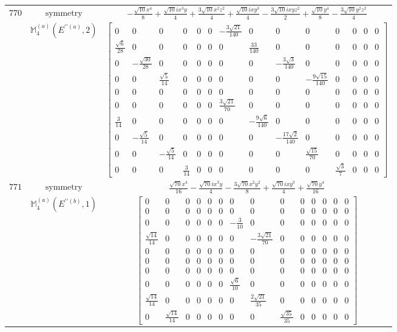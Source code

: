 \documentclass[fleqn,8pt,landscape]{jsarticle}
\begin{document}
\begin{longtable}{ccc}
$ 770 $ & $ \text{symmetry} $ & $ - \frac{\sqrt{10} x^{4}}{8} + \frac{\sqrt{10} i x^{3} y}{4} + \frac{3 \sqrt{10} x^{2} z^{2}}{4} + \frac{\sqrt{10} i x y^{3}}{4} - \frac{3 \sqrt{10} i x y z^{2}}{2} + \frac{\sqrt{10} y^{4}}{8} - \frac{3 \sqrt{10} y^{2} z^{2}}{4} $ \\
$  $ & $ \mathbb{M}_{4}^{(a)}(E^{\prime\prime(a)},2) $ & $ \begin{bmatrix} 0 & 0 & 0 & 0 & 0 & 0 & - \frac{3 \sqrt{21}}{140} & 0 & 0 & 0 & 0 & 0 & 0 & 0 \\ \frac{\sqrt{6}}{28} & 0 & 0 & 0 & 0 & 0 & 0 & \frac{33}{140} & 0 & 0 & 0 & 0 & 0 & 0 \\ 0 & - \frac{\sqrt{30}}{28} & 0 & 0 & 0 & 0 & 0 & 0 & - \frac{3 \sqrt{3}}{140} & 0 & 0 & 0 & 0 & 0 \\ 0 & 0 & \frac{\sqrt{5}}{14} & 0 & 0 & 0 & 0 & 0 & 0 & - \frac{9 \sqrt{15}}{140} & 0 & 0 & 0 & 0 \\ 0 & 0 & 0 & 0 & 0 & 0 & 0 & 0 & 0 & 0 & 0 & 0 & 0 & 0 \\ 0 & 0 & 0 & 0 & 0 & 0 & \frac{3 \sqrt{21}}{70} & 0 & 0 & 0 & 0 & 0 & 0 & 0 \\ \frac{3}{14} & 0 & 0 & 0 & 0 & 0 & 0 & - \frac{9 \sqrt{6}}{140} & 0 & 0 & 0 & 0 & 0 & 0 \\ 0 & - \frac{\sqrt{5}}{14} & 0 & 0 & 0 & 0 & 0 & 0 & - \frac{17 \sqrt{2}}{140} & 0 & 0 & 0 & 0 & 0 \\ 0 & 0 & - \frac{\sqrt{5}}{14} & 0 & 0 & 0 & 0 & 0 & 0 & \frac{\sqrt{15}}{70} & 0 & 0 & 0 & 0 \\ 0 & 0 & 0 & \frac{3}{14} & 0 & 0 & 0 & 0 & 0 & 0 & \frac{\sqrt{3}}{7} & 0 & 0 & 0 \end{bmatrix} $ \\ \hline
$ 771 $ & $ \text{symmetry} $ & $ \frac{\sqrt{70} x^{4}}{16} - \frac{\sqrt{70} i x^{3} y}{4} - \frac{3 \sqrt{70} x^{2} y^{2}}{8} + \frac{\sqrt{70} i x y^{3}}{4} + \frac{\sqrt{70} y^{4}}{16} $ \\
$  $ & $ \mathbb{M}_{4}^{(a)}(E^{\prime\prime(b)},1) $ & $ \begin{bmatrix} 0 & 0 & 0 & 0 & 0 & 0 & 0 & 0 & 0 & 0 & 0 & 0 & 0 & 0 \\ 0 & 0 & 0 & 0 & 0 & 0 & 0 & 0 & 0 & 0 & 0 & 0 & 0 & 0 \\ 0 & 0 & 0 & 0 & 0 & 0 & - \frac{3}{10} & 0 & 0 & 0 & 0 & 0 & 0 & 0 \\ \frac{\sqrt{14}}{14} & 0 & 0 & 0 & 0 & 0 & 0 & - \frac{3 \sqrt{21}}{70} & 0 & 0 & 0 & 0 & 0 & 0 \\ 0 & 0 & 0 & 0 & 0 & 0 & 0 & 0 & 0 & 0 & 0 & 0 & 0 & 0 \\ 0 & 0 & 0 & 0 & 0 & 0 & 0 & 0 & 0 & 0 & 0 & 0 & 0 & 0 \\ 0 & 0 & 0 & 0 & 0 & 0 & 0 & 0 & 0 & 0 & 0 & 0 & 0 & 0 \\ 0 & 0 & 0 & 0 & 0 & 0 & \frac{\sqrt{6}}{10} & 0 & 0 & 0 & 0 & 0 & 0 & 0 \\ \frac{\sqrt{14}}{14} & 0 & 0 & 0 & 0 & 0 & 0 & \frac{2 \sqrt{21}}{35} & 0 & 0 & 0 & 0 & 0 & 0 \\ 0 & \frac{\sqrt{14}}{14} & 0 & 0 & 0 & 0 & 0 & 0 & \frac{\sqrt{35}}{35} & 0 & 0 & 0 & 0 & 0 \end{bmatrix} $ \\ \hline

\end{longtable}
\end{document}
